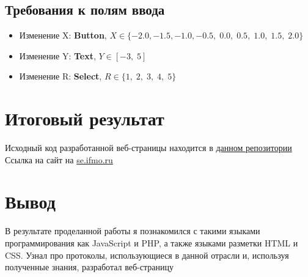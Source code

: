 \documentclass[12pt,a4paper]{report}
\begin{document}
\subsection*{Требования к полям ввода}
\begin{itemize}
    \item Изменение X: \textbf{Button}, $X \in \{-2.0, -1.5, -1.0, -0.5, \;0.0, \;0.5, \;1.0, \;1.5, \;2.0\}$
    \item Изменение Y: \textbf{Text}, $Y \in [-3, \;5]$
    \item Изменение R: \textbf{Select}, $R \in \{1, \;2, \;3, \;4, \;5\}$
\end{itemize}
\section*{Итоговый результат}
Исходный код разработанной веб-страницы находится в \href{https://github.com/Armemius/ItmoStuff/tree/main/web-programming/lab1}{данном репозитории} \\
\hfill\break
Ссылка на сайт на \href{https://se.ifmo.ru/~s368849/lab1/}{se.ifmo.ru}
\section*{Вывод}
В результате проделанной работы я познакомился с такими языками программирования как JavaScript и PHP, а также языками разметки HTML и CSS. Узнал про протоколы, использующиеся в данной отрасли и, используя полученные знания, разработал веб-страницу
\end{document}
